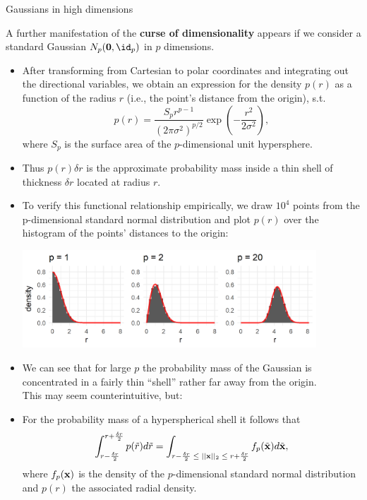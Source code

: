 \documentclass[11pt,compress,t,notes=noshow, xcolor=table]{beamer}
\begin{document}
\begin{vbframe}{Gaussians in high dimensions}

A further manifestation of the \textbf{curse of dimensionality} appears if we consider a standard Gaussian $N_p(\bm{0}, \id_p)$ in $p$ dimensions.

\begin{itemize}
    \item After transforming from Cartesian to polar coordinates and integrating out the directional variables, we obtain an expression for the density $p(r)$ as a function of the radius $r$ (i.e., the point's distance from the origin), s.t.
    $$ p(r) = \frac{S_p r^{p-1}}{(2 \pi \sigma^2)^{p/2}} \exp \left( -\frac{r^2}{2\sigma^2}\right),$$
    where $S_p$ is the surface area of the $p$-dimensional unit hypersphere.
    \item Thus $p(r) \delta r$ is the approximate probability mass inside a thin shell of thickness $\delta r$ located at radius $r$. 
    
  
\framebreak 
\item To verify this functional relationship empirically, we draw $10^4$ points from the p-dimensional standard normal distribution and plot $p(r)$ over the histogram of the points' distances to the origin:

\begin{center}
\includegraphics[width = 11cm ]{figure/gauss_high_dim_hist_plot.png}
\end{center}

\item We can see that for large $p$ the probability mass of the Gaussian is concentrated in a fairly thin \enquote{shell} rather far away from the origin. \\
This may seem counterintuitive, but:

\framebreak

  \item For the probability mass of a hyperspherical shell it follows that
    $$\int^{r + \frac{\delta r}{2}}_{r - \frac{\delta r}{2}}p(\tilde{r})d\tilde{r} = \int_{r - \frac{\delta r}{2} \; \leq \; ||\mathbf{x}||_2 \; \leq \; r + \frac{\delta r}{2}} f_p(\tilde{\mathbf{x}}) d\tilde{\mathbf{x}},$$
    where $f_p(\mathbf{x})$ is the density of the $p$-dimensional standard normal distribution and $p(r)$ the associated radial density.


\end{itemize}
\end{vbframe}
\end{document}
